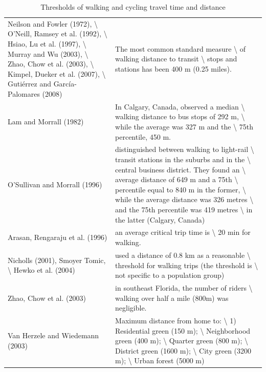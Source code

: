 \documentclass[
11pt, %
oneside, %
english, %
singlespacing, %
]{macthesis} %
\begin{document}
\begin{landscape}\begingroup\fontsize{12}{14}\selectfont

\begin{longtable}[t]{>{\raggedright\arraybackslash}p{9cm}>{\raggedright\arraybackslash}p{9cm}}
\caption{\label{tab:ch02-make-table-09}\label{tab:ch02-make-table-09}Thresholds of walking and cycling travel time and distance}\\
\toprule
\multicolumn{1}{>{\centering\arraybackslash}p{9cm}}{\textbf{Distance/Time thresholds}} & \multicolumn{1}{>{\centering\arraybackslash}p{9cm}}{\textbf{Description}}\\
\midrule
Neilson and Fowler (1972), \textbackslash{} O'Neill, Ramsey et al. (1992), \textbackslash{} Hsiao, Lu et al. (1997), \textbackslash{} Murray and Wu (2003), \textbackslash{} Zhao, Chow et al. (2003), \textbackslash{} Kimpel, Dueker et al. (2007), \textbackslash{} Gutiérrez and García-Palomares (2008) & The most common standard measure \textbackslash{} of walking distance to transit \textbackslash{} stops and stations has been 400 m (0.25 miles).\\
Lam and Morrall (1982) & In Calgary, Canada, observed a median \textbackslash{} walking distance to bus stops of 292 m, \textbackslash{} while the average was 327 m and the \textbackslash{} 75th percentile, 450 m.\\
O'Sullivan and Morrall (1996) & distinguished between walking to light-rail \textbackslash{} transit stations in the suburbs and in the \textbackslash{} central business district. They found an \textbackslash{} average distance of 649 m and a 75th \textbackslash{} percentile equal to 840 m in the former, \textbackslash{} while the average distance was 326 metres \textbackslash{} and the 75th percentile was 419 metres \textbackslash{} in the latter (Calgary, Canada)\\
Arasan, Rengaraju et al. (1996) & an average critical trip time is \textbackslash{} 20 min for walking.\\
Nicholls (2001), Smoyer Tomic, \textbackslash{} Hewko et al. (2004) & used a distance of 0.8 km as a reasonable \textbackslash{} threshold for walking trips (the threshold is \textbackslash{} not specific to a population group)\\
\addlinespace
Zhao, Chow et al. (2003) & in southeast Florida, the number of riders \textbackslash{} walking over half a mile (800m) was negligible.\\
Van Herzele and Wiedemann (2003) & Maximum distance from home to: \textbackslash{} 1) Residential green (150 m); \textbackslash{} Neighborhood green (400 m); \textbackslash{} Quarter green (800 m); \textbackslash{} District green (1600 m); \textbackslash{} City green (3200 m); \textbackslash{} Urban forest (5000 m)\\

\end{longtable}
\end{landscape}
\end{document}

